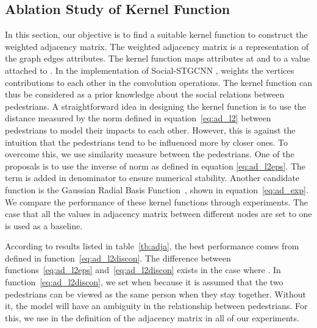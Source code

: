 \documentclass[10pt,twocolumn,letterpaper]{article}
\newcommand*{\ours}{Social-STGCNN }
\begin{document}
\subsection {Ablation Study of Kernel Function}
\label{sec:adjacency}
In this section, our objective is to find a suitable kernel function to construct the weighted adjacency matrix. The weighted adjacency matrix  is a representation of the graph edges attributes. The kernel function maps attributes at  and  to a value  attached to . In the implementation of \ours,  weights the vertices contributions to each other in the convolution operations. The kernel function can thus be considered as a prior knowledge about the social relations between pedestrians. A straightforward idea in designing the kernel function is to use the distance measured by the  norm defined in equation~\ref{eq:ad_l2} between pedestrians to model their impacts to each other. However, this is against the intuition that the pedestrians tend to be influenced more by closer ones. To overcome this, we use similarity measure between the pedestrians. One of the proposals is to use the inverse of  norm as defined in equation \ref{eq:ad_l2eps}. The  term is added in denominator to ensure numerical stability. Another candidate function is the Gaussian Radial Basis Function~\cite{vert2004primer}, shown in equation~\ref{eq:ad_exp}. We compare the performance of these kernel functions through experiments. The case that all the values in adjacency matrix between different nodes are set to one is used as a baseline.

According to results listed in table~\ref{tb:adja}, the best performance comes from  defined in function~\ref{eq:ad_l2discon}. The difference between functions~\ref{eq:ad_l2eps} and~\ref{eq:ad_l2discon} exists in the case where . In function~\ref{eq:ad_l2discon}, we set  when  because it is assumed that the two pedestrians can be viewed as the same person when they stay together. Without it, the model will have an ambiguity in the relationship between pedestrians. For this, we use  in the definition of the adjacency matrix in all of our experiments. 
\end{document}
